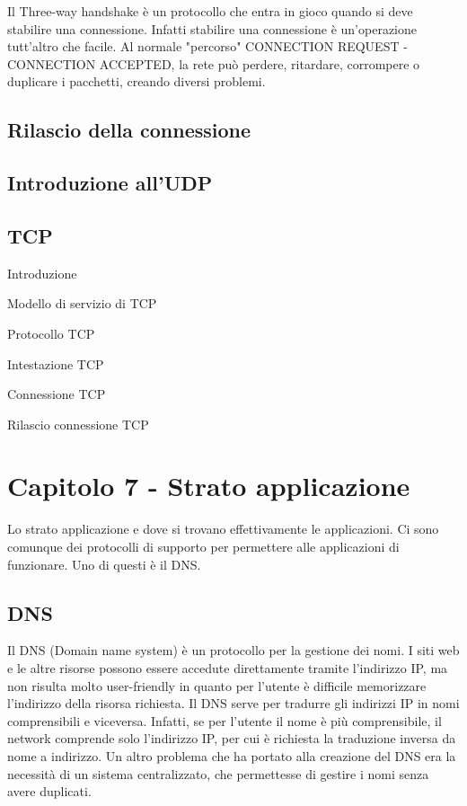 Il Three-way handshake è un protocollo che entra in gioco quando si deve stabilire una connessione.
Infatti stabilire una connessione è un'operazione tutt'altro che facile.
Al normale "percorso" CONNECTION REQUEST - CONNECTION ACCEPTED, la rete può perdere, ritardare, corrompere o duplicare i pacchetti, creando diversi problemi.



\subsection{Rilascio della connessione}

\subsection{Introduzione all'UDP}

\subsection{TCP}

Introduzione

Modello di servizio di TCP

Protocollo TCP

Intestazione TCP

Connessione TCP

Rilascio connessione TCP




\newpage
\section{Capitolo 7 - Strato applicazione} %

Lo strato applicazione e dove si trovano effettivamente le applicazioni.
Ci sono comunque dei protocolli di supporto per permettere alle applicazioni di funzionare.
Uno di questi è il DNS.

\subsection{DNS}

Il DNS (Domain name system) è un protocollo per la gestione dei nomi.
I siti web e le altre risorse possono essere accedute direttamente tramite l'indirizzo IP,
ma non risulta molto user-friendly in quanto per l'utente è difficile memorizzare l'indirizzo della risorsa richiesta.
Il DNS serve per tradurre gli indirizzi IP in nomi comprensibili e viceversa.
Infatti, se per l'utente il nome è più comprensibile, il network comprende solo l'indirizzo IP, per cui è richiesta la traduzione inversa da nome a indirizzo.
Un altro problema che ha portato alla creazione del DNS era la necessità di un sistema centralizzato, che permettesse di gestire i nomi senza avere duplicati.

